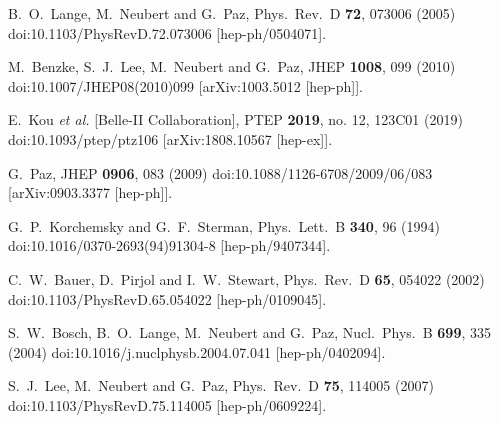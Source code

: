 \begin{thebibliography}{99}
  B.~O.~Lange, M.~Neubert and G.~Paz,
  Phys.\ Rev.\ D {\bf 72}, 073006 (2005)
  doi:10.1103/PhysRevD.72.073006
  [hep-ph/0504071].
  
  M.~Benzke, S.~J.~Lee, M.~Neubert and G.~Paz,
  JHEP {\bf 1008}, 099 (2010)
  doi:10.1007/JHEP08(2010)099
  [arXiv:1003.5012 [hep-ph]].
  
  E.~Kou {\it et al.} [Belle-II Collaboration],
  PTEP {\bf 2019}, no. 12, 123C01 (2019)
  doi:10.1093/ptep/ptz106
  [arXiv:1808.10567 [hep-ex]].
  
  G.~Paz,
  JHEP {\bf 0906}, 083 (2009)
  doi:10.1088/1126-6708/2009/06/083
  [arXiv:0903.3377 [hep-ph]].
  
  G.~P.~Korchemsky and G.~F.~Sterman,
  Phys.\ Lett.\ B {\bf 340}, 96 (1994)
  doi:10.1016/0370-2693(94)91304-8
  [hep-ph/9407344].
  
  C.~W.~Bauer, D.~Pirjol and I.~W.~Stewart,
  Phys.\ Rev.\ D {\bf 65}, 054022 (2002)
  doi:10.1103/PhysRevD.65.054022
  [hep-ph/0109045].
  
  S.~W.~Bosch, B.~O.~Lange, M.~Neubert and G.~Paz,
  Nucl.\ Phys.\ B {\bf 699}, 335 (2004)
  doi:10.1016/j.nuclphysb.2004.07.041
  [hep-ph/0402094].
  
  S.~J.~Lee, M.~Neubert and G.~Paz,
  Phys.\ Rev.\ D {\bf 75}, 114005 (2007)
  doi:10.1103/PhysRevD.75.114005
  [hep-ph/0609224].
  

\end{thebibliography}
